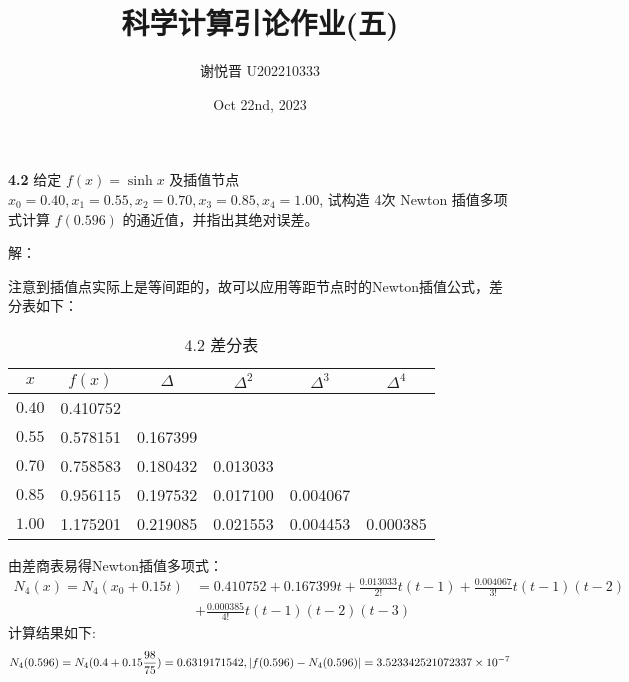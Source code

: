 \documentclass[a4paper,11pt,UTF8]{article}
\title{科学计算引论作业(五)}
\author{谢悦晋 \quad U202210333}
\date{Oct 22nd, 2023 }
\begin{document}
\maketitle
\textbf{4.2} 给定 $f(x)=\sinh x$ 及插值节点 $x_0=0.40,x_1=0.55,x_2=0.70,x_3=0.85,x_4=1.00$, 试构造 4次 Newton 插值多项式计算 $f(0.596)$ 的通近值，并指出其绝对误差。

解：

注意到插值点实际上是等间距的，故可以应用等距节点时的Newton插值公式，差分表如下：
\begin{table*}[h]
	\centering
	\caption{4.2 差分表}
	
	\begin{tabular}{|c|c|c|c|c|c|}
		\hline
		$x$ & $f(x)$ & $\Delta$ & $\Delta^2$ & $\Delta^3$ & $\Delta^4$\\
		\hline
		$0.40$ & 0.410752 &  &&&\\
		\hline
		$0.55$ & 0.578151 & 0.167399 &&&\\
		\hline
		$0.70$ & 0.758583 & 0.180432 & 0.013033&&\\
		\hline
		$0.85$ & 0.956115 & 0.197532 & 0.017100 & 0.004067&\\
		\hline
		$1.00$ & 1.175201 & 0.219085 & 0.021553 & 0.004453& 0.000385\\
		\hline
	\end{tabular}
\end{table*}
由差商表易得Newton插值多项式：
$$\begin{aligned}
	N_4(x)=N_4(x_0+0.15t)&=0.410752+0.167399t+\frac{0.013033}{2!}t(t-1)+\frac{0.004067}{3!}t(t-1)(t-2)\\&+\frac{0.000385}{4!}t(t-1)(t-2)(t-3)
\end{aligned}
$$
计算结果如下:
$$
	N_4(0.596)=N_4(0.4+0.15\frac{98}{75})=0.6319171542,\\ |f(0.596)-N_4(0.596)|=3.523342521072337\times10^{-7}
$$
\end{document}
